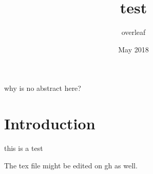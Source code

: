 \documentclass{article}
\title{test}
\author{overleaf }
\date{May 2018}
\begin{document}
\maketitle
why is no abstract here?
\section{Introduction}
this is a test

The tex file might be edited on gh as well.
\end{document}
